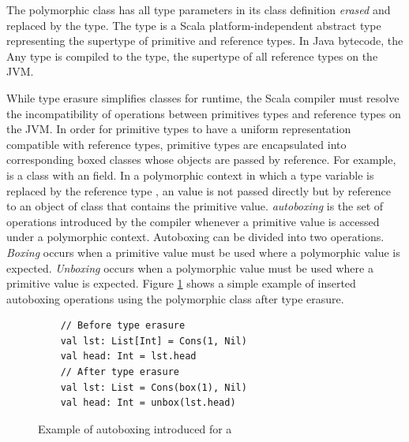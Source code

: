 The polymorphic  class has all type parameters in its class definition \textit{erased} and replaced by the  type.
The  type is a Scala platform-independent\cite{scala:overview} abstract type representing the supertype of primitive and reference types.
In Java bytecode, the {Any} type is compiled to the  type, the supertype of all reference types on the JVM.

While type erasure simplifies classes for runtime, the Scala compiler must resolve the incompatibility of operations between primitives types and reference types on the JVM\cite{java:vm-spec}.
In order for primitive types to have a uniform representation compatible with reference types, primitive types are encapsulated into corresponding boxed classes whose objects are passed by reference.
For example,  is a class with an  field.
In a polymorphic context in which a type variable is replaced by the reference type , an  value is not passed directly but by reference to an object of class  that contains the primitive value.
\textit{autoboxing}\cite{java:autoboxing} is the set of operations introduced by the compiler whenever a primitive value is accessed under a polymorphic context. 
Autoboxing can be divided into two operations.
\textit{Boxing} occurs when a primitive value must be used where a polymorphic value is expected.
\textit{Unboxing} occurs when a polymorphic value must be used where a primitive value is expected.
Figure \ref{example:autoboxing} shows a simple example of inserted autoboxing operations using the polymorphic  class after type erasure.

\begin{figure}[!htb]
	\begin{verbatim}
	// Before type erasure 	
	val lst: List[Int] = Cons(1, Nil)
	val head: Int = lst.head
	// After type erasure
	val lst: List = Cons(box(1), Nil)
	val head: Int = unbox(lst.head) 
	\end{verbatim}
	\caption{Example of autoboxing introduced for a }
	\label{example:autoboxing}
\end{figure}

